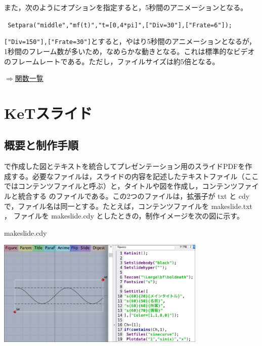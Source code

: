 \documentclass[papersize,a4paper,12pt,uplatex]{jsarticle}
\begin{document}
また，次のようにオプションを指定すると，5秒間のアニメーションとなる。

\verb| Setpara("middle","mf(t)","t=[0,4*pi]",["Div=30"],["Frate=6"]);|

\verb|["Div=150"],["Frate=30"]|とすると，やはり5秒間のアニメーションとなるが，1秒間のフレーム数が多いため，なめらかな動きとなる。これは標準的なビデオのフレームレートである。ただし，ファイルサイズは約5倍となる。


\begin{flushright} \hyperlink{functionlist}{$\Rightarrow$関数一覧}\end{flushright}


\newpage


\section{KeTスライド}
\subsection{概要と制作手順}
\ketcindy で作成した図とテキストを統合してプレゼンテーション用のスライドPDFを作成する。必要なファイルは，スライドの内容を記述したテキストファイル（ここではコンテンツファイルと呼ぶ）と，タイトルや図を作成し，コンテンツファイルと統合する \ketcindy のファイルである。この2つのファイルは，拡張子が txt と cdy で，ファイル名は同一とする。たとえば，コンテンツファイルを makeslide.txt ， \ketcindy ファイルを makeslide.cdy としたときの，制作イメージを次の図に示す。

\hspace{10mm}

\hspace{10mm}makeslide.cdy

\hspace{10mm}\includegraphics[bb=0.00 0.00 881.05 451.02,width=10cm]{Fig/slide01.pdf} 
\end{document}

